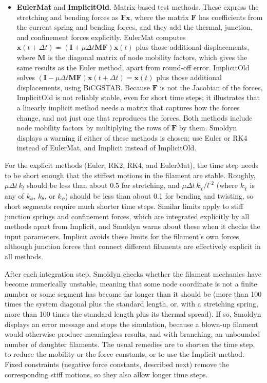 \documentclass {scrbook}
\begin{document}
\begin{itemize}
\item \textbf{EulerMat} and \textbf{ImplicitOld}. Matrix-based test methods. These express the stretching and bending forces as $\bm{F}\bm{x}$, where the matrix $\bm{F}$ has coefficients from the current spring and bending forces, and they add the thermal, junction, and confinement forces explicitly. EulerMat computes $\bm{x}(t+\Delta t) = (\bm{I}+\mu\Delta t\bm{M}\bm{F})\bm{x}(t)$ plus those additional displacements, where $\bm{M}$ is the diagonal matrix of node mobility factors, which gives the same results as the Euler method, apart from round-off error. ImplicitOld solves $(\bm{I}-\mu\Delta t\bm{M}\bm{F})\bm{x}(t+\Delta t) = \bm{x}(t)$ plus those additional displacements, using BiCGSTAB. Because $\bm{F}$ is not the Jacobian of the forces, ImplicitOld is not reliably stable, even for short time steps; it illustrates that a linearly implicit method needs a matrix that captures how the forces change, and not just one that reproduces the forces. Both methods include node mobility factors by multiplying the rows of $\bm{F}$ by them. Smoldyn displays a warning if either of these methods is chosen; use Euler or RK4 instead of EulerMat, and Implicit instead of ImplicitOld.
\end{itemize}

For the explicit methods (Euler, RK2, RK4, and EulerMat), the time step needs to be short enough that the stiffest motions in the filament are stable. Roughly, $\mu\Delta t\,k_l$ should be less than about 0.5 for stretching, and $\mu\Delta t\,k_\chi/l^{\circ 2}$ (where $k_\chi$ is any of $k_\phi$, $k_\theta$, or $k_\psi$) should be less than about 0.1 for bending and twisting, so short segments require much shorter time steps. Similar limits apply to stiff junction springs and confinement forces, which are integrated explicitly by all methods apart from Implicit, and Smoldyn warns about these when it checks the input parameters. Implicit avoids these limits for the filament's own forces, although junction forces that connect different filaments are effectively explicit in all methods.

After each integration step, Smoldyn checks whether the filament mechanics have become numerically unstable, meaning that some node coordinate is not a finite number or some segment has become far longer than it should be (more than 100 times the system diagonal plus the standard length, or, with a stretching spring, more than 100 times the standard length plus its thermal spread). If so, Smoldyn displays an error message and stops the simulation, because a blown-up filament would otherwise produce meaningless results, and with branching, an unbounded number of daughter filaments. The usual remedies are to shorten the time step, to reduce the mobility or the force constants, or to use the Implicit method. Fixed constraints (negative force constants, described next) remove the corresponding stiff motions, so they also allow longer time steps.
\end{document}
